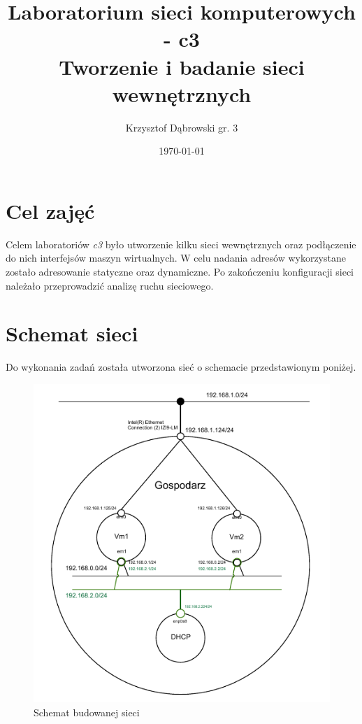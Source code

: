 \documentclass{mwart} %
\title{Laboratorium sieci komputerowych - c3 \\ Tworzenie i badanie sieci wewnętrznych}
\author{Krzysztof Dąbrowski gr. 3}
\date{\today}
\begin{document}
\maketitle{}
\tableofcontents{}

\section{Cel zajęć}
Celem laboratoriów \textit{c3} było utworzenie kilku sieci wewnętrznych oraz podłączenie do nich interfejsów maszyn wirtualnych. W celu nadania adresów wykorzystane zostało adresowanie statyczne oraz dynamiczne. Po zakończeniu konfiguracji sieci należało przeprowadzić analizę ruchu sieciowego.

\section{Schemat sieci}
Do wykonania zadań została utworzona sieć o schemacie przedstawionym poniżej.

\begin{figure}[H]
  \centering
  \includegraphics[width=\textwidth]{Projekt_Sieci}
  
  \caption{Schemat budowanej sieci}
  \label{fig:SchematSieci}
\end{figure}
\end{document}
